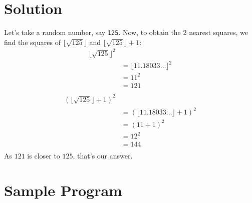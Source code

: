 \documentclass[12pt]{report}
\begin{document}
  \section*{Solution}
   Let's take a random number, say \texttt{125}. Now, to obtain the 2 nearest squares, we find the squares of $\lfloor\sqrt{125}\rfloor$ and $\lfloor\sqrt{125}\rfloor+1$:
   \begin{align*}
    \lfloor\sqrt{125}\rfloor^2\\
    &= \lfloor11.18033\dots\rfloor^2\\
    &= 11^2\\
    &= 121\\
   \end{align*}
   \begin{align*}
    (\lfloor\sqrt{125}\rfloor+1)^2\\
    &= (\lfloor11.18033\dots\rfloor+1)^2\\
    &= (11+1)^2\\
    &= 12^2\\
    &= 144\\
   \end{align*}
   As $121$ is closer to $125$, that's our answer.

	\section*{Sample Program}
	
	
\end{document}
